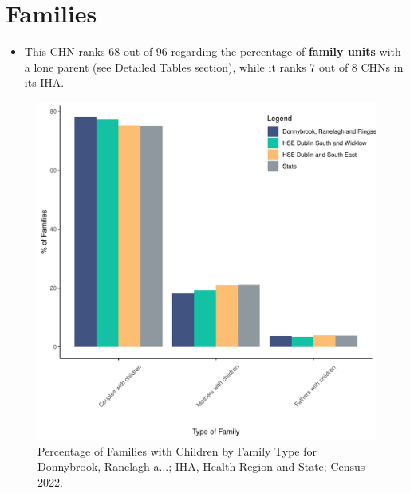 \documentclass{article}
\begin{document}
\section{Families}\label{sect:Fam}
\begin{itemize}
\item This CHN ranks  68 out of 96 regarding the percentage of \textbf{family units} with a lone parent (see Detailed Tables section), while it ranks   7 out of 8 CHNs in its IHA.
\end{itemize}
\begin{figure}[H]
	\centering
	\includegraphics[width = 150mm]{../figures/FamED.pdf}
	\caption{Percentage of Families with Children by Family Type for Donnybrook, Ranelagh a...; IHA, Health Region and State; Census 2022.}
	\label{fig:vbnv}
	\end{figure}
	
\end{document}
